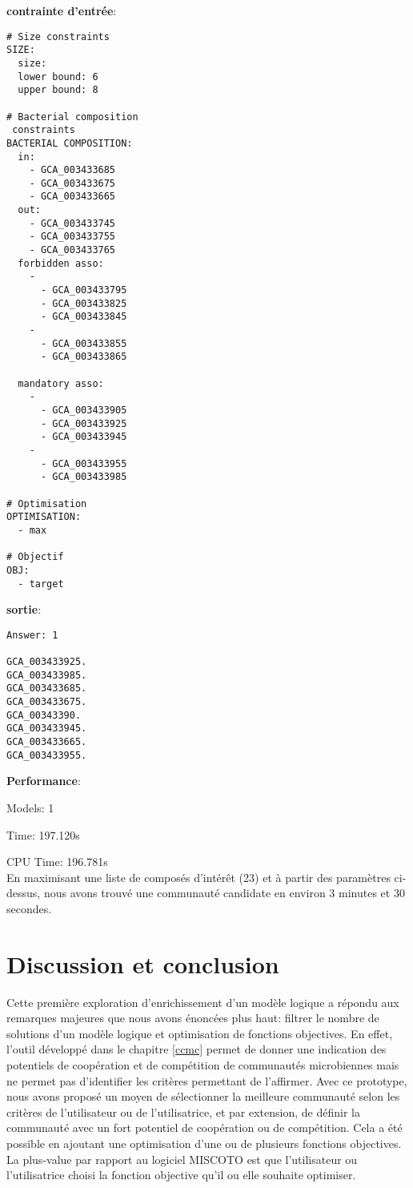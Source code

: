 \documentclass[../main.tex]{subfiles}
\begin{document}
\noindent
\begin{minipage}[t]{0.4\textwidth}
\textbf{contrainte d'entrée}: 
\begin{lstlisting}[style=yaml]
# Size constraints
SIZE:
  size: 
  lower bound: 6
  upper bound: 8

# Bacterial composition
 constraints
BACTERIAL COMPOSITION:
  in: 
    - GCA_003433685
    - GCA_003433675
    - GCA_003433665
  out: 
    - GCA_003433745
    - GCA_003433755
    - GCA_003433765
  forbidden asso: 
    - 
      - GCA_003433795
      - GCA_003433825
      - GCA_003433845
    - 
      - GCA_003433855
      - GCA_003433865

  mandatory asso: 
    - 
      - GCA_003433905
      - GCA_003433925
      - GCA_003433945
    - 
      - GCA_003433955
      - GCA_003433985
      
# Optimisation
OPTIMISATION: 
  - max

# Objectif
OBJ:
  - target
\end{lstlisting}
\end{minipage}%
\hspace{2.5em}\begin{minipage}[t]{0.5\textwidth}
\textbf{sortie}: 

\begin{lstlisting}
Answer: 1

GCA_003433925.
GCA_003433985.
GCA_003433685.
GCA_003433675.
GCA_00343390.
GCA_003433945.
GCA_003433665.
GCA_003433955.
\end{lstlisting}
\textbf{Performance}: 

Models: 1

Time: 197.120s 

CPU Time: 196.781s\\

En maximisant une liste de composés d'intérêt (23) et à partir des paramètres ci-dessus, nous avons trouvé une communauté candidate en environ 3 minutes et 30 secondes.
\end{minipage}

\section{Discussion et conclusion}
Cette première exploration d'enrichissement d'un modèle logique a répondu aux remarques majeures que nous avons énoncées plus haut: filtrer le nombre de solutions d'un modèle logique et optimisation de fonctions objectives. En effet, l'outil développé dans le chapitre \ref{ccmc} permet de donner une indication des potentiels de coopération et de compétition de communautés microbiennes mais ne permet pas d'identifier les critères permettant de l'affirmer. Avec ce prototype, nous avons proposé un moyen de sélectionner la meilleure communauté selon les critères de l'utilisateur ou de l'utilisatrice, et par extension, de définir la communauté avec un fort potentiel de coopération ou de compétition. Cela a été possible en ajoutant une optimisation d'une ou de plusieurs fonctions objectives. La plus-value par rapport au logiciel MISCOTO est que l'utilisateur ou l'utilisatrice choisi la fonction objective qu'il ou elle souhaite optimiser.\\
\end{document}
